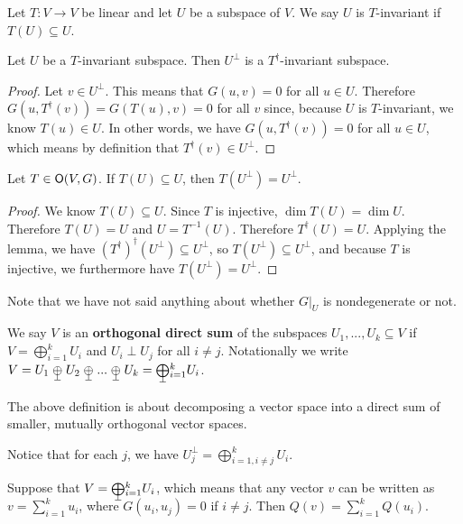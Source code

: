 \begin{defn} Let $T:V\to V$ be linear and let $U$ be a subspace of $V$. We say $U$ is $T$-invariant if $T(U) \subseteq U$.
\end{defn}
\begin{lemma}
    Let $U$ be a $T$-invariant subspace. Then $U^\perp$ is a $T^\dagger$-invariant subspace.
\end{lemma}
\begin{proof}
    Let $v \in U^\perp$. This means that $G(u,v) = 0$ for all $u \in U$. Therefore $G(u,T^\dagger(v))=G(T(u),v) = 0$ for all $v$ since, because $U$ is $T$-invariant, we know $T(u)\in U$. In other words, we have $G(u,T^\dagger(v))=0$ for all $u\in U$, which means by definition that $T^\dagger(v) \in U^\perp$.
\end{proof}
\begin{cor}
Let $T \in \operatorname{\textsf{O}}(V,G)$. If $T(U)\subseteq U$, then $T(U^\perp) = U^\perp$.
\end{cor}
\begin{proof}
    We know $T(U)\subseteq U$. Since $T$ is injective, $\dim T(U) = \dim U$. Therefore $T(U)=U$ and $U=T^{-1}(U)$. Therefore $T^\dagger(U)=U$. Applying the lemma, we have $(T^\dagger)^\dagger (U^\perp) \subseteq U^\perp$, so $T(U^\perp)\subseteq U^\perp$, and because $T$ is injective, we furthermore have $T(U^\perp) = U^\perp$.
\end{proof}
\begin{remark*}
    Note that we have not said anything about whether $G|_U$ is nondegenerate or not.
\end{remark*}
\begin{defn}
    We say $V$ is an \textbf{orthogonal direct sum} of the subspaces $U_1,...,U_k\subseteq V$ if $V = \bigoplus_{i=1}^k U_i$ and $U_i\perp U_j$ for all $i\neq j$. Notationally we write $V = U_1 \orthoplus U_2 \orthoplus...\orthoplus U_k = \bigorthoplus_{i=1}^k U_i$.
\end{defn}
\begin{remark*}
    The above definition is about decomposing a vector space into a direct sum of smaller, mutually orthogonal vector spaces. 
\end{remark*}
\begin{remark*}
    Notice that for each $j$, we have $U_j^\perp = \bigoplus_{i=1, i\neq j}^k U_i$.
\end{remark*}
\begin{remark*}
    Suppose that $V = \bigorthoplus_{i=1}^k U_i$, which means that any vector $v$ can be written as $v=\sum_{i=1}^k u_i$, where $G(u_i,u_j) = 0$ if $i\neq j$. Then $Q(v) = \sum_{i=1}^k Q(u_i)$.
\end{remark*}
